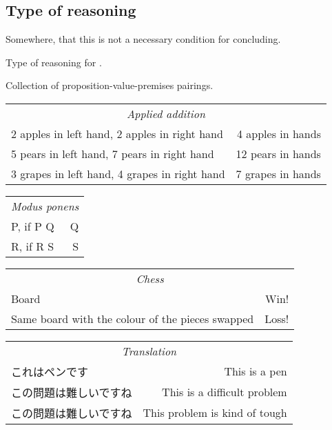 \chapter{}
\label{cha:typical}

\section{Type of reasoning}
\label{sec:gr-sr}

{
  \color{red}
  Somewhere, that this is not a necessary condition for concluding.
}

\begin{note}
  \begin{definition}
    \label{def:type-r}
    Type of reasoning for \vAgent{}.

    Collection of proposition-value-premises pairings.
  \end{definition}

  \begin{tabular}[h]{l|r}
    \multicolumn{2}{c}{\emph{Applied addition}} \\
    2 apples in left hand, 2 apples in right hand & 4 apples in hands \\
    5 pears in left hand, 7 pears in right hand & 12 pears in hands \\
    3 grapes in left hand, 4 grapes in right hand & 7 grapes in hands \\
  \end{tabular}

  \begin{tabular}[h]{l|r}
    \multicolumn{2}{c}{\emph{Modus ponens}} \\
    P, if P Q & Q \\
    R, if R S & S \\
  \end{tabular}

  \begin{tabular}[h]{l|r}
    \multicolumn{2}{c}{\emph{Chess}} \\
    Board & Win! \\
    Same board with the colour of the pieces swapped & Loss! \\
  \end{tabular}

  \begin{tabular}[h]{l|r}
    \multicolumn{2}{c}{\emph{Translation}} \\
    これはペンです & This is a pen \\
    この問題は難しいですね & This is a difficult problem \\
    この問題は難しいですね & This problem is kind of tough \\
  \end{tabular}


\end{note}
